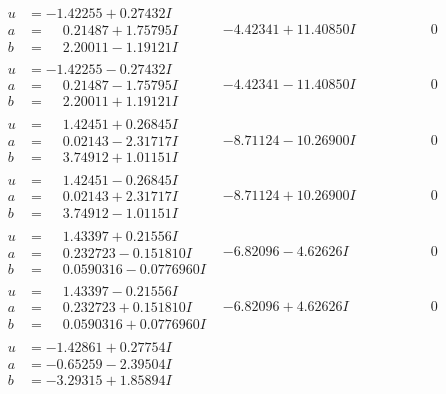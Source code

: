 \documentclass[1p]{elsarticle_modified}
\theoremstyle{definition}
\begin{document}
$$\begin{array}{c|c|c}
\begin{aligned}
u &= -1.42255 + 0.27432 I \\
a &= \phantom{-}0.21487 + 1.75795 I \\
b &= \phantom{-}2.20011 - 1.19121 I\end{aligned}
 & -4.42341 + 11.40850 I & \phantom{-0.000000 } 0 \\ \hline\begin{aligned}
u &= -1.42255 - 0.27432 I \\
a &= \phantom{-}0.21487 - 1.75795 I \\
b &= \phantom{-}2.20011 + 1.19121 I\end{aligned}
 & -4.42341 - 11.40850 I & \phantom{-0.000000 } 0 \\ \hline\begin{aligned}
u &= \phantom{-}1.42451 + 0.26845 I \\
a &= \phantom{-}0.02143 - 2.31717 I \\
b &= \phantom{-}3.74912 + 1.01151 I\end{aligned}
 & -8.71124 - 10.26900 I & \phantom{-0.000000 } 0 \\ \hline\begin{aligned}
u &= \phantom{-}1.42451 - 0.26845 I \\
a &= \phantom{-}0.02143 + 2.31717 I \\
b &= \phantom{-}3.74912 - 1.01151 I\end{aligned}
 & -8.71124 + 10.26900 I & \phantom{-0.000000 } 0 \\ \hline\begin{aligned}
u &= \phantom{-}1.43397 + 0.21556 I \\
a &= \phantom{-}0.232723 - 0.151810 I \\
b &= \phantom{-}0.0590316 - 0.0776960 I\end{aligned}
 & -6.82096 - 4.62626 I & \phantom{-0.000000 } 0 \\ \hline\begin{aligned}
u &= \phantom{-}1.43397 - 0.21556 I \\
a &= \phantom{-}0.232723 + 0.151810 I \\
b &= \phantom{-}0.0590316 + 0.0776960 I\end{aligned}
 & -6.82096 + 4.62626 I & \phantom{-0.000000 } 0 \\ \hline\begin{aligned}
u &= -1.42861 + 0.27754 I \\
a &= -0.65259 - 2.39504 I \\
b &= -3.29315 + 1.85894 I\end{aligned}

\end{array}$$
\end{document}
